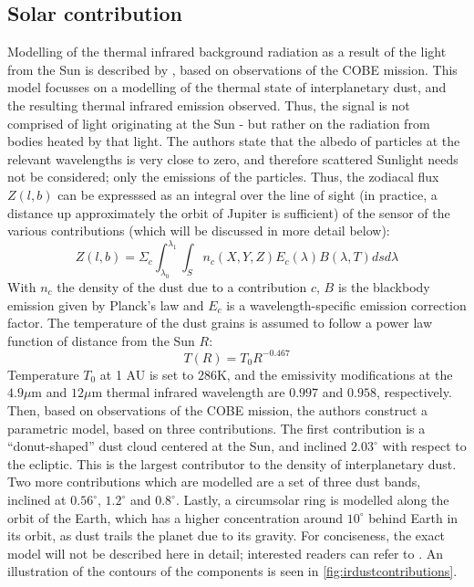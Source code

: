 \subsection{Solar contribution}
Modelling of the thermal infrared background radiation as a result of the light from the Sun is described by \cite{IRDust}, based on observations of the COBE mission. This model focusses on a modelling of the thermal state of interplanetary dust, and the resulting thermal infrared emission observed. Thus, the signal is not comprised of light originating at the Sun - but rather on the radiation from bodies heated by that light. The authors state that the albedo of particles at the relevant wavelengths is very close to zero, and therefore scattered Sunlight needs not be considered; only the emissions of the particles. Thus, the zodiacal flux $Z(l, b)$ can be expresssed as an integral over the line of sight (in practice, a distance up approximately the orbit of Jupiter is sufficient) of the sensor of the various contributions (which will be discussed in  more detail below):
\begin{equation}
 Z(l, b) = \Sigma_c \int _{\lambda_0} ^{\lambda_1} \int _S n_{c}(X, Y, Z)  E_{c}(\lambda) B(\lambda, T) ds d\lambda
 \label{eq:irdustflux}
\end{equation}
With $n_c$ the density of the dust due to a contribution $c$, $B$ is the blackbody emission given by Planck's law and $E_c$ is a wavelength-specific emission correction factor. The temperature of the dust grains is assumed to follow a power law function of distance from the Sun $R$:
\begin{equation}
 T(R) = T_0R^{-0.467}
\end{equation}
Temperature $T_0$ at 1 AU is set to $286\mathrm{K}$, and the emissivity modifications at the $4.9 \mu\mathrm{m}$ and $12 \mu\mathrm{m}$ thermal infrared wavelength are $0.997$ and $0.958$, respectively. Then, based on observations of the COBE mission, the authors construct a parametric model, based on three contributions. The first contribution is a ``donut-shaped'' dust cloud centered at the Sun, and inclined $2.03^\circ$ with respect to the ecliptic. This is the largest contributor to the density of interplanetary dust. Two more contributions which are modelled are a set of three dust bands, inclined at $0.56^\circ$, $1.2^\circ$ and $0.8^\circ$. Lastly, a circumsolar ring is modelled along the orbit of the Earth, which has a higher concentration around $10^\circ$ behind Earth in its orbit, as dust trails the planet due to its gravity. For conciseness, the exact model will not be described here in detail; interested readers can refer to \cite{IRDust}. An illustration of the contours of the components is seen in \autoref{fig:irdustcontributions}.\\

